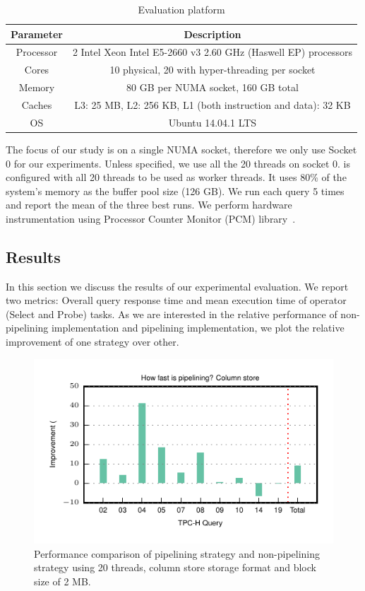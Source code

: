 \begin{table}[h]
	\centering
	\begin{tabular}{|c|c|}
		\hline
		\textbf{Parameter} & \textbf{Description} \\ \hline
		Processor & 2 Intel Xeon Intel E5-2660 v3 2.60 GHz (Haswell EP) processors\\ \hline
		Cores & 10 physical, 20 with hyper-threading per socket \\ \hline
		Memory & 80 GB per NUMA socket, 160 GB total \\ \hline
		Caches & L3: 25 MB, L2: 256 KB, L1 (both instruction and data): 32 KB \\ \hline
		OS & Ubuntu 14.04.1 LTS \\ \hline
	\end{tabular}
	\caption{Evaluation platform}
	\label{table:pipeline-hardware}
\end{table}

The focus of our study is on a single NUMA socket, therefore we only use Socket 0 for our experiments. 
Unless specified, we use all the 20 threads on socket 0.
\sys{} is configured with all 20 threads to be used as worker threads.
It uses 80\% of the system's memory as the buffer pool size (126 GB).
We run each query 5 times and report the mean of the three best runs. 
We perform hardware instrumentation using Processor Counter Monitor (PCM) library~\cite{pcm}.

\subsection{Results}
In this section we discuss the results of our experimental evaluation. 
We report two metrics: Overall query response time and mean execution time of operator (Select and Probe) tasks.
As we are interested in the relative performance of non-pipelining implementation and pipelining implementation, we plot the relative improvement of one strategy over other. 

\begin{figure}
	\centering 
	\includegraphics[width=0.6\textheight]{pipeline/figures/bs2mb-20threads-colstore-total-time}
	\caption{Performance comparison of pipelining strategy and non-pipelining strategy using 20 threads, column store storage format and block size of 2 MB.}
	\label{fig:bs2mb-20threads-colstore-total-time}
\end{figure}

